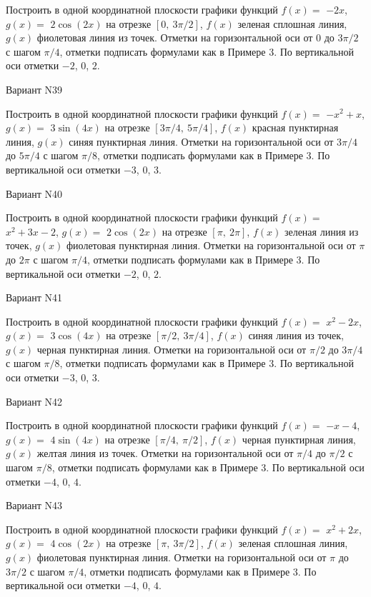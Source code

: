 \documentclass[11pt]{report}
\begin{document}
Построить в одной координатной плоскости графики функций $f(x) = $
    $- 2 x$, $g(x) = $
    $2 \cos{\left(2 x \right)}$ на 
    отрезке $\left[ 0, \  3 \pi / 2\right]$, $f(x)$ зеленая 
    сплошная линия, $g(x)$ фиолетовая линия из точек. 
    Отметки на горизонтальной оси от $0$ до $3 \pi / 2$ с 
    шагом $\pi / 4$, отметки подписать формулами как в Примере 3.  
    По вертикальной оси отметки $-2$, 0, $2$.

Вариант N39

Построить в одной координатной плоскости графики функций $f(x) = $
    $- x^{2} + x$, $g(x) = $
    $3 \sin{\left(4 x \right)}$ на 
    отрезке $\left[ 3 \pi / 4, \  5 \pi / 4\right]$, $f(x)$ красная 
    пунктирная линия, $g(x)$ синяя пунктирная линия. 
    Отметки на горизонтальной оси от $3 \pi / 4$ до $5 \pi / 4$ с 
    шагом $\pi / 8$, отметки подписать формулами как в Примере 3.  
    По вертикальной оси отметки $-3$, 0, $3$.

Вариант N40

Построить в одной координатной плоскости графики функций $f(x) = $
    $x^{2} + 3 x - 2$, $g(x) = $
    $2 \cos{\left(2 x \right)}$ на 
    отрезке $\left[ \pi, \  2 \pi\right]$, $f(x)$ зеленая 
    линия из точек, $g(x)$ фиолетовая пунктирная линия. 
    Отметки на горизонтальной оси от $\pi$ до $2 \pi$ с 
    шагом $\pi / 4$, отметки подписать формулами как в Примере 3.  
    По вертикальной оси отметки $-2$, 0, $2$.

Вариант N41

Построить в одной координатной плоскости графики функций $f(x) = $
    $x^{2} - 2 x$, $g(x) = $
    $3 \cos{\left(4 x \right)}$ на 
    отрезке $\left[ \pi / 2, \  3 \pi / 4\right]$, $f(x)$ синяя 
    линия из точек, $g(x)$ черная пунктирная линия. 
    Отметки на горизонтальной оси от $\pi / 2$ до $3 \pi / 4$ с 
    шагом $\pi / 8$, отметки подписать формулами как в Примере 3.  
    По вертикальной оси отметки $-3$, 0, $3$.

Вариант N42

Построить в одной координатной плоскости графики функций $f(x) = $
    $- x - 4$, $g(x) = $
    $4 \sin{\left(4 x \right)}$ на 
    отрезке $\left[ \pi / 4, \  \pi / 2\right]$, $f(x)$ черная 
    пунктирная линия, $g(x)$ желтая линия из точек. 
    Отметки на горизонтальной оси от $\pi / 4$ до $\pi / 2$ с 
    шагом $\pi / 8$, отметки подписать формулами как в Примере 3.  
    По вертикальной оси отметки $-4$, 0, $4$.

Вариант N43

Построить в одной координатной плоскости графики функций $f(x) = $
    $x^{2} + 2 x$, $g(x) = $
    $4 \cos{\left(2 x \right)}$ на 
    отрезке $\left[ \pi, \  3 \pi / 2\right]$, $f(x)$ зеленая 
    сплошная линия, $g(x)$ фиолетовая пунктирная линия. 
    Отметки на горизонтальной оси от $\pi$ до $3 \pi / 2$ с 
    шагом $\pi / 4$, отметки подписать формулами как в Примере 3.  
    По вертикальной оси отметки $-4$, 0, $4$.
\end{document}

